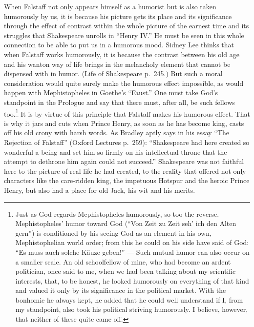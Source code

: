 \documentclass[12pt]{book}
\newcommand{\opage}[1]{\marginnote{\footnotesize\textit{[#1]}}}
\begin{document}
When Falstaff not only appears himself as a humorist but is also taken humorously by us, it
is because his picture gets its place and its significance through the effect of contrast
within the whole picture of the earnest time and its struggles that Shakespeare unrolls in
``Henry IV.'' He must be seen in this whole connection to be able to put us in a humorous
mood. Sidney Lee thinks that when Falstaff works humorously, it is because the contrast
between his old age and his wanton way of life brings in the melancholy element that cannot
be dispensed with in humor. (Life of Shakespeare p.~245.) But such a moral consideration
would quite \opage{117}surely make the humorous effect impossible, as would happen with
Mephistopheles in Goethe's ``Faust.'' One must take God's standpoint in the Prologue and
say that there must, after all, be such fellows too.\footnote{Just as God regards
Mephistopheles humorously, so too the reverse. Mephistopheles' humor toward God (``Von Zeit
zu Zeit seh' ich den Alten gern'') is conditioned by his seeing God as an element in his
own, Mephistophelian world order; from this he could on his side have said of God: ``Es
muss auch solche Käuze geben!'' --- Such mutual humor can also occur on a smaller scale. An
old schoolfellow of mine, who had become an ardent politician, once said to me, when we had
been talking about my scientific interests, that, to be honest, he looked humorously on
everything of that kind and valued it only by its significance in the political market.
With the bonhomie he always kept, he added that he could well understand if I, from my
standpoint, also took his political striving humorously. I believe, however, that neither
of these quite came off.} It is by virtue of this principle that Falstaff makes his
humorous effect. That is why it jars and cuts when Prince Henry, as soon as he has become
king, casts off his old crony with harsh words. As Bradley aptly says in his essay ``The
Rejection of Falstaff'' (Oxford Lectures p.~259): ``Shakespeare had here created so
wonderful a being and set him so firmly on his intellectual throne that the attempt to
dethrone him again could not succeed.'' Shakespeare was not faithful here to the picture
of real life he had created, to the reality that offered not only characters like the
care-ridden king, the impetuous Hotspur and the heroic Prince Henry, but also had a place
for old Jack, his wit and his merits.
\end{document}
